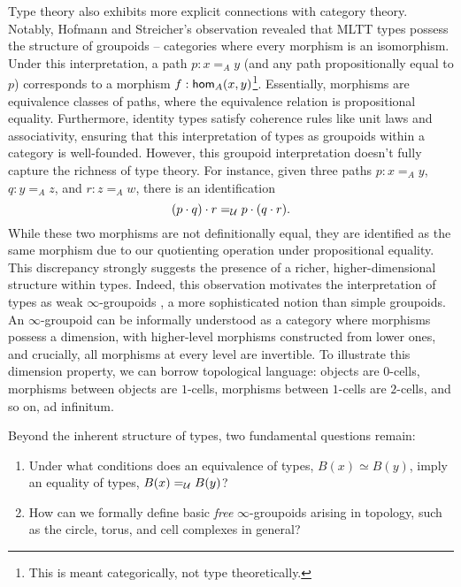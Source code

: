 \documentclass[main.tex]{subfiles}
\begin{document}
Type theory also exhibits more explicit connections with category theory. Notably, Hofmann and Streicher's observation \cite{hofmann1998groupoid} revealed that MLTT types possess the structure of groupoids – categories where every morphism is an isomorphism. Under this interpretation, a path $p : x=_A y$ (and any path propositionally equal to $p$) corresponds to a morphism $f : \ho[A]{x}{y}$\footnote{This is meant categorically, not type theoretically.}. Essentially, morphisms are equivalence classes of paths, where the equivalence relation is propositional equality. Furthermore, identity types satisfy coherence rules like unit laws and associativity, ensuring that this interpretation of types as groupoids within a category is well-founded. However, this groupoid interpretation doesn't fully capture the richness of type theory. For instance, given three paths $p : x =_A y$, $q : y=_A z$, and $r : z =_A w$, there is an identification
 \[
 (p \cdot q) \cdot r =_\U p \cdot (q \cdot r).
 \]
While these two morphisms are not definitionally equal, they are identified as the same morphism due to our quotienting operation under propositional equality. This discrepancy strongly suggests the presence of a richer, higher-dimensional structure within types. Indeed, this observation motivates the interpretation of types as weak $\infty$-groupoids \cite{berg_garner_richard}, a more sophisticated notion than simple groupoids. An $\infty$-groupoid can be informally understood as a category where morphisms possess a dimension, with higher-level morphisms constructed from lower ones, and crucially, all morphisms at every level are invertible. To illustrate this dimension property, we can borrow topological language: objects are $0$-cells, morphisms between objects are $1$-cells, morphisms between $1$-cells are $2$-cells, and so on, ad infinitum.

Beyond the inherent structure of types, two fundamental questions remain:
\begin{enumerate}
  \item Under what conditions does an equivalence of types, $B(x) \simeq B(y)$, imply an equality of types, $B(x)=_{\U} B(y)$?
  \item How can we formally define basic \textit{free} $\infty$-groupoids arising in topology, such as the circle, torus, and cell complexes in general?
\end{enumerate}
\end{document}
